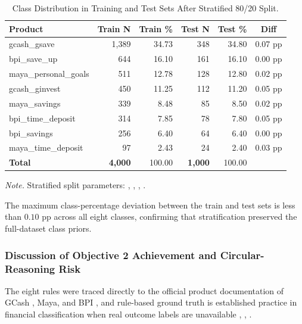 \documentclass{icsthesis}
\begin{document}
\begin{mainmatter}
					\begin{table}[h]
					\vspace{4ex}
					\centering
					\caption{Class Distribution in Training and Test Sets After Stratified 80/20 Split.}
					\label{tab:split}
					\footnotesize
					\begin{tabular}{|p{2.5cm}|r|r|r|r|c|}
						\hline
						\textbf{Product} & \textbf{Train N} & \textbf{Train \%} & \textbf{Test N} & \textbf{Test \%} & \textbf{Diff} \\
						\hline
						gcash\_gsave & 1{,}389 & 34.73 & 348 & 34.80 & 0.07 pp \\
						bpi\_save\_up & 644 & 16.10 & 161 & 16.10 & 0.00 pp \\
						maya\_personal\_\newline goals & 511 & 12.78 & 128 & 12.80 & 0.02 pp \\
						gcash\_ginvest & 450 & 11.25 & 112 & 11.20 & 0.05 pp \\
						maya\_savings & 339 & 8.48 & 85 & 8.50 & 0.02 pp \\
						bpi\_time\_deposit & 314 & 7.85 & 78 & 7.80 & 0.05 pp \\
						bpi\_savings & 256 & 6.40 & 64 & 6.40 & 0.00 pp \\
						maya\_time\_deposit & 97 & 2.43 & 24 & 2.40 & 0.03 pp \\
						\hline
						\textbf{Total} & \textbf{4{,}000} & 100.00 & \textbf{1{,}000} & 100.00 & \\
						\hline
					\end{tabular}

					\vspace{0.5em}
					\raggedright\scriptsize \emph{Note.} Stratified split parameters: , ,  \cite{ref59}, \cite{ref74}.
					\vspace{4ex}
					\end{table}

					The maximum class-percentage deviation between the train and test sets is less than $0.10$ pp across all eight classes, confirming that stratification preserved the full-dataset class priors.

				\subsubsection{Discussion of Objective 2 Achievement and Circular-Reasoning Risk}
					The eight rules were traced directly to the official product documentation of GCash \cite{ref6}, Maya, and BPI \cite{ref37}, and rule-based ground truth is established practice in financial classification when real outcome labels are unavailable \cite{ref46}, \cite{ref56}, \cite{ref57}.


\end{mainmatter}
\end{document}
